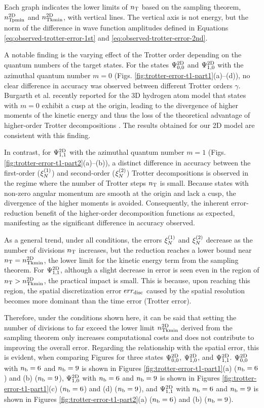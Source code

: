 \documentclass[jctc-draft.tex]{subfiles}
\begin{document}
Each graph indicates the lower limits of $n_{\mathrm{T}}$ based on the sampling theorem,
$n_{\mathrm{Tpmin}}^{\mathrm{2D}}$ and $n_{\mathrm{Tkmin}}^{\mathrm{2D}}$, with vertical lines. The vertical axis is not
energy, but the norm of the difference in wave function amplitudes defined in
Equations \eqref{eq:observed-trotter-error-1st} and
\eqref{eq:observed-trotter-error-2nd}.

A notable finding is the varying effect of the Trotter order depending on the
quantum numbers of the target states. For the states $\Psi^{\mathrm{2D}}_{0,0}$ and
$\Psi^{\mathrm{2D}}_{1,0}$ with the azimuthal quantum number $m=0$ (Figs.
\ref{fig:trotter-error-t1-part1}(a)--(d)), no clear difference in accuracy was
observed between different Trotter orders $\gamma$. Burgarth et al. recently
reported for the 3D hydrogen atom model that states with $m=0$ exhibit a cusp at
the origin, leading to the divergence of higher moments of the kinetic energy
and thus the loss of the theoretical advantage of higher-order Trotter
decompositions \cite{Burgarth2024.PhysRevResearch.6.043155}. The results
obtained for our 2D model are consistent with this finding.

In contrast, for $\Psi^{\mathrm{2D}}_{1,1}$ with the azimuthal quantum number $m=1$ (Figs.
\ref{fig:trotter-error-t1-part2}(a)--(b)), a distinct difference in accuracy
between the first-order ($\xi_{N}^{(1)}$) and second-order ($\xi_{N}^{(2)}$) Trotter
decompositions is observed in the regime where the number of Trotter steps $n_{\mathrm{T}}$
is small. Because states with non-zero angular momentum are smooth at the origin
and lack a cusp, the divergence of the higher moments is avoided. Consequently,
the inherent error-reduction benefit of the higher-order decomposition functions
as expected, manifesting as the significant difference in accuracy observed.

As a general trend, under all conditions, the errors $\xi_{N}^{(1)}$ and $\xi_{N}^{(2)}$
decrease as the number of divisions $n_{\mathrm{T}}$ increases, but the reduction reaches a
lower bound near $n_{\mathrm{T}} = n_{\mathrm{Tkmin}}^{\mathrm{2D}}$, the lower limit for the kinetic energy
term from the sampling theorem. For $\Psi^{\mathrm{2D}}_{1,1}$, although a slight decrease
in error is seen even in the region of $n_{\mathrm{T}} > n_{\mathrm{Tkmin}}^{\mathrm{2D}}$, the practical impact
is small. This is because, upon reaching this region, the spatial discretization
error $err_{\mathrm{disc}}$ caused by the spatial resolution becomes more dominant than the
time error (Trotter error).

Therefore, under the conditions shown here, it can be said that setting the
number of divisions to far exceed the lower limit $n_{\mathrm{Tkmin}}^{\mathrm{2D}}$ derived from the
sampling theorem only increases computational costs and does not contribute to
improving the overall error. Regarding the relationship with the spatial error,
this is evident, when comparing Figures for three states $\Psi^{\mathrm{2D}}_{0,0}$,
$\Psi^{\mathrm{2D}}_{1,0}$, and $\Psi^{\mathrm{2D}}_{1,1}$. $\Psi^{\mathrm{2D}}_{0,0}$ with $n_{\mathrm{b}}=6$ and
$n_{\mathrm{b}}=9$ is shown in Figures \ref{fig:trotter-error-t1-part1}(a) ($n_{\mathrm{b}}=6$) and
(b) ($n_{\mathrm{b}}=9$), $\Psi^{\mathrm{2D}}_{1,0}$ with $n_{\mathrm{b}}=6$ and $n_{\mathrm{b}}=9$ is shown in Figures
\ref{fig:trotter-error-t1-part1}(c) ($n_{\mathrm{b}}=6$) and (d) ($n_{\mathrm{b}}=9$), and
$\Psi^{\mathrm{2D}}_{1,1}$ with $n_{\mathrm{b}}=6$ and $n_{\mathrm{b}}=9$ is shown in Figures
\ref{fig:trotter-error-t1-part2}(a) ($n_{\mathrm{b}}=6$) and (b) ($n_{\mathrm{b}}=9$).
\end{document}

